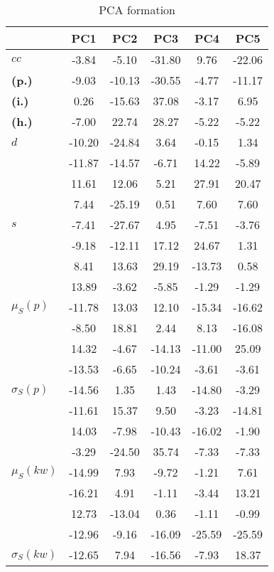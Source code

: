 \begin{table}[h!]
\begin{center}
\caption{PCA formation}
\begin{tabular}{| l || c | c | c | c | c |}\hline
 & {\bf PC1} & {\bf PC2} & {\bf PC3} & {\bf PC4} & {\bf PC5} \\\hline\hline
{\bf $cc$} & -3.84 & -5.10 & -31.80 & 9.76 & -22.06 \\
{\bf (p.)} & -9.03 & -10.13 & -30.55 & -4.77 & -11.17 \\
{\bf (i.)} & 0.26 & -15.63 & 37.08 & -3.17 & 6.95 \\
{\bf (h.)} & -7.00 & 22.74 & 28.27 & -5.22 & -5.22 \\\hline
{\bf $d$} & -10.20 & -24.84 & 3.64 & -0.15 & 1.34 \\
{\bf } & -11.87 & -14.57 & -6.71 & 14.22 & -5.89 \\
{\bf } & 11.61 & 12.06 & 5.21 & 27.91 & 20.47 \\
{\bf } & 7.44 & -25.19 & 0.51 & 7.60 & 7.60 \\\hline
{\bf $s$} & -7.41 & -27.67 & 4.95 & -7.51 & -3.76 \\
{\bf } & -9.18 & -12.11 & 17.12 & 24.67 & 1.31 \\
 & 8.41  & 13.63  & 29.19  & -13.73  & 0.58 \\
 & 13.89  & -3.62  & -5.85  & -1.29  & -1.29 \\\hline
$\mu_S(p)$ & -11.78  & 13.03  & 12.10  & -15.34  & -16.62 \\
 & -8.50  & 18.81  & 2.44  & 8.13  & -16.08 \\
 & 14.32  & -4.67  & -14.13  & -11.00  & 25.09 \\
 & -13.53  & -6.65  & -10.24  & -3.61  & -3.61 \\\hline
$\sigma_S(p)$ & -14.56  & 1.35  & 1.43  & -14.80  & -3.29 \\
 & -11.61  & 15.37  & 9.50  & -3.23  & -14.81 \\
 & 14.03  & -7.98  & -10.43  & -16.02  & -1.90 \\
 & -3.29  & -24.50  & 35.74  & -7.33  & -7.33 \\\hline
$\mu_S(kw)$ & -14.99  & 7.93  & -9.72  & -1.21  & 7.61 \\
 & -16.21  & 4.91  & -1.11  & -3.44  & 13.21 \\
 & 12.73  & -13.04  & 0.36  & -1.11  & -0.99 \\
 & -12.96  & -9.16  & -16.09  & -25.59  & -25.59 \\\hline
$\sigma_S(kw)$ & -12.65  & 7.94  & -16.56  & -7.93  & 18.37 \\

\end{tabular}
\end{center}
\end{table}
